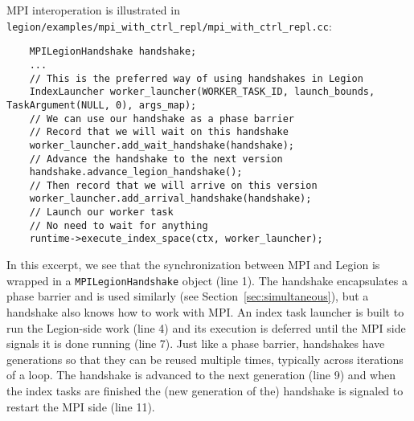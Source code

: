 MPI interoperation is illustrated in {\tt legion/examples/mpi\_with\_ctrl\_repl/mpi\_with\_ctrl\_repl.cc}:
  \begin{lstlisting}
    MPILegionHandshake handshake;
    ...
    // This is the preferred way of using handshakes in Legion                                                                                                                                                                                                                               
    IndexLauncher worker_launcher(WORKER_TASK_ID, launch_bounds, TaskArgument(NULL, 0), args_map);
    // We can use our handshake as a phase barrier                                                                                                                                                                                                                                          
    // Record that we will wait on this handshake    
    worker_launcher.add_wait_handshake(handshake);
    // Advance the handshake to the next version
    handshake.advance_legion_handshake();
    // Then record that we will arrive on this version
    worker_launcher.add_arrival_handshake(handshake);
    // Launch our worker task
    // No need to wait for anything
    runtime->execute_index_space(ctx, worker_launcher);
  \end{lstlisting}
In this excerpt, we see that the synchronization between MPI and Legion is wrapped in a {\tt MPILegionHandshake} object (line 1).  The handshake encapsulates a phase barrier and is used similarly (see Section~\ref{sec:simultaneous}), but a handshake also knows how to work with MPI.
An index task launcher is built to run the Legion-side work (line 4) and its execution is deferred until the MPI side signals it is done running (line 7).  Just like a phase barrier, handshakes have generations so that they can be reused multiple times, typically across
iterations of a loop.  The handshake is advanced to the next generation (line 9) and when the index tasks are finished the (new generation of the) handshake is signaled to restart the MPI side (line 11).

